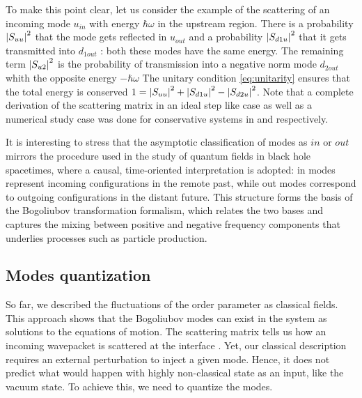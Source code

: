 To make this point clear, let us consider the example of the scattering of an incoming mode $u_{in}$ with energy $\hbar\omega$ in the upstream region. 
There is a probability $\abs{S_{uu}}^2$ that the mode gets reflected in $u_{out}$ and a probability $\abs{S_{d1u}}^2$ that it gets transmitted into $d_{1out}$ : both these modes have the same energy. The remaining term $\abs{S_{u2}}^2$ is the probability of transmission into a negative norm mode $d_{2out}$ whith the opposite energy $-\hbar\omega$
The unitary condition \autoref{eq:unitarity} ensures that the total energy is conserved $1=\abs{S_{uu}}^2+\abs{S_{d1u}}^2-\abs{S_{d2u}}^2$. Note that a complete 
derivation of the scattering matrix in an ideal step like case as well as a numerical study case was done for conservative systems in \cite{Recati_acousticHR_2009} and \cite{fabbri_steplike_2011} respectively.


It is interesting to stress that the asymptotic classification of modes as $in$ or $out$ mirrors the procedure used in the study of quantum fields in black hole spacetimes, where a causal, time-oriented interpretation is adopted: in modes represent incoming configurations in the remote past, while out modes correspond to outgoing configurations in the distant future.
 This structure forms the basis of the Bogoliubov transformation formalism, which relates the two bases and captures the mixing between positive and negative frequency components that underlies processes such as particle production.
\subsection{Modes quantization}
\label{subsec:quantization}
So far, we described the fluctuations of the order parameter as classical fields. This approach
shows that the Bogoliubov modes can exist in the system as solutions to the equations of motion. The scattering matrix
 tells us how an incoming wavepacket is scattered at the interface \cite{Recati_acousticHR_2009}.
Yet, our classical description requires an external perturbation to inject a given mode. Hence, it does not
predict what would happen with highly non-classical state as an input, like the vacuum state. To achieve this, we need to quantize the modes.

